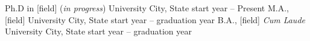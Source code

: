 

\begin{cventries}

  \cventry
    {Ph.D in [field] (\emph{in progress})} %
    {University} %
    {City, State} %
    {start year -- Present} %
    {}
    \vspace{1em}
\cventry
  {M.A., [field]} %
  {University} %
  {City, State} %
  {start year -- graduation year} %
  {}
  \vspace{1em}
\cventry
  {B.A., [field] \emph{Cum Laude}} %
  {University} %
  {City, State} %
  {start year -- graduation year} %
  {}
  \end{cventries}


